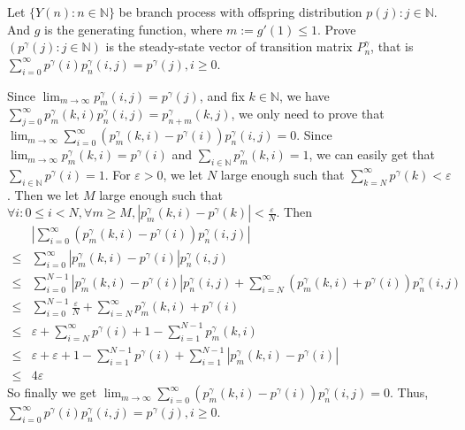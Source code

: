 \documentclass{ctexart}
\begin{document}
\begin{problem}\label{pro:5}
  Let \(\{Y(n): n \in \mathbb{N}\}\) be branch process with offspring distribution \(p(j): j \in \mathbb{N}\).
  And \(g\) is the generating function, where \(m :=g' (1) \leq 1\).
  Prove \((p^\gamma(j): j \in \mathbb{N})\) is the steady-state vector of
  transition matrix \(P_n^\gamma\), that is \(\sum_{i =0}^{\infty} p^\gamma(i)p_n^\gamma(i,j)=p^{\gamma}(j), i \geq 0\).
\end{problem}
\begin{solution}
  Since \(\lim_{m \to \infty}p_m^\gamma(i,j)=p^\gamma(j)\), and fix \(k \in \mathbb{N}\), we have
  \(\sum_{j=0}^{\infty} p_m^\gamma(k,i)p_n^\gamma(i,j)=p_{n+m}^\gamma(k,j)\),
  we only need to prove that \(\lim_{m \to \infty}\sum_{i=0}^{\infty} (p_m^\gamma(k,i)-p^\gamma(i))p_n^\gamma(i,j)=0\).
  Since \(\lim_{m \to \infty}p_m^\gamma(k,i) =p^\gamma(i)\) and \(\sum_{i \in \mathbb{N}}p_m^\gamma(k,i)=1\),
  we can easily get that \(\sum_{i \in \mathbb{N}}p^\gamma(i)=1\).
  For \(\varepsilon>0\), we let \(N\) large enough such that \(\sum_{k=N}^{\infty} p^\gamma(k)<\varepsilon\).
  Then we let \(M\) large enough such that \(\forall i:0 \leq i <N,\forall m \geq M,|p_{m}^\gamma(k,i)-p^\gamma(k)|<\frac{\varepsilon}{N}\).
  Then
  \[
    \begin{aligned}
           & \left|\sum_{i=0}^{\infty} (p_m^\gamma(k,i)-p^\gamma(i))p_n^\gamma(i,j)\right|                                                                      \\
      \leq & \sum_{i=0}^{\infty} |p_m^\gamma(k,i)-p^\gamma(i)|p_n^\gamma(i,j)                                                                                   \\
      \leq & \sum_                    {i=0}^{N-1} |p_m^\gamma(k,i)-p^\gamma(i)|p_n^\gamma(i,j)+\sum_{i=N}^{\infty} (p_m^\gamma(k,i)+p^\gamma(i))p_n^\gamma(i,j) \\
      \leq & \sum_{i=0}^              {N-1} \frac{\varepsilon}{N} + \sum_{i=N}^{\infty} p_m^\gamma(k,i)+p^\gamma(i)                                             \\
      \leq & \varepsilon+\sum_        {i=N}^{\infty} p^\gamma(i) +1- \sum_{i=1}^{N-1} p_m^\gamma(k,i)                                                           \\
      \leq & \varepsilon + \varepsilon + 1 - \sum_{i=1}^{N-1} p^\gamma(i) + \sum_{i=1}^{N-1} |p_m^\gamma(k,i)-p^\gamma(i)|                                      \\
      \leq & 4\varepsilon
    \end{aligned}
  \]
  So finally we get \(\lim_{m \to \infty}\sum_{i=0}^{\infty} (p_m^\gamma(k,i)-p^\gamma(i))p_n^\gamma(i,j)=0\).
  Thus, \(\sum_{i =0}^{\infty} p^\gamma(i)p_n^\gamma(i,j)=p^{\gamma}(j), i \geq 0\).
\end{solution}
\end{document}
